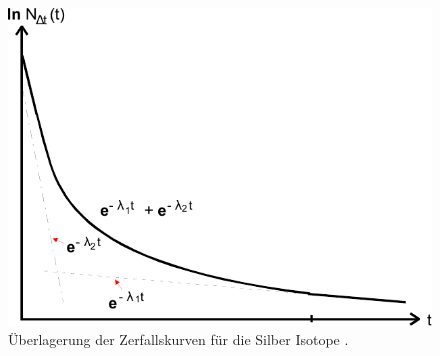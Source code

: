 \begin{figure}
    \centering
    \includegraphics{Abbildungen/Zerfallskurven.pdf}
    \caption{Überlagerung der Zerfallskurven für die Silber Isotope \cite{man:v702}.}
    \label{fig:teo_e-funktionen-krampf}
\end{figure}


